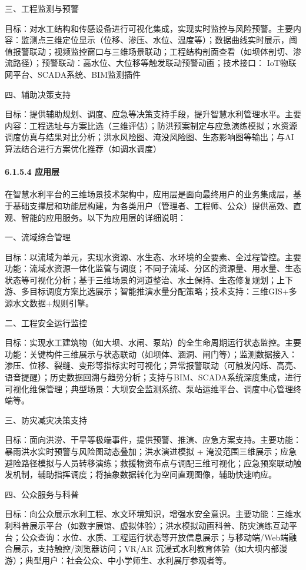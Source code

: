 三、工程监测与预警

目标：对水工结构和传感设备进行可视化集成，实现实时监控与风险预警。主要内容：监测点三维定位显示（位移、渗压、水位、温度等）；数据曲线实时展示，阈值报警联动；视频监控窗口与三维场景联动；工程结构剖面查看（如坝体剖切、渗流路径）；预警联动：高水位、大位移等触发联动预警动画；技术接口： IoT物联网平台、SCADA系统、BIM监测插件

四、辅助决策支持

目标：提供辅助规划、调度、应急等决策支持手段，提升智慧水利管理水平。主要内容：工程选址与方案比选（三维评估）；防洪预案制定与应急演练模拟；水资源调度仿真与结果对比分析；洪水风险图、淹没风险图、生态影响图等输出；与AI算法结合进行方案优化推荐（如调水调度）

\paragraph{6.1.5.4 应用层}\label{ux5e94ux7528ux5c42}

在智慧水利平台的三维场景技术架构中，应用层是面向最终用户的业务集成层，基于基础支撑层和功能层构建，为各类用户（管理者、工程师、公众）提供高效、直观、智能的应用服务。以下为应用层的详细说明：

一、流域综合管理

目标：以流域为单元，实现水资源、水生态、水环境的全要素、全过程管控。主要功能：流域水资源一体化监管与调度；不同子流域、分区的资源量、用水量、生态状态等可视化分析；基于三维场景的河道整治、水土保持、生态修复规划；上下游、多目标调度方案比选展示；智能推演水量分配策略；技术支持：三维GIS+多源水文数据+规则引擎。

二、工程安全运行监控

目标：实现水工建筑物（如大坝、水闸、泵站）的全生命周期运行状态监控。主要功能：关键构件三维展示与状态联动（如坝体、涵洞、闸门等）；监测数据接入：渗压、位移、裂缝、变形等指标实时可视化；异常报警联动（可触发闪烁、高亮、语音提醒）；历史数据回溯与趋势分析；支持与BIM、SCADA系统深度集成，进行可视化维保管理；典型场景：大坝安全监测系统、泵站运维平台、调度中心管理终端等。

三、防灾减灾决策支持

目标：面向洪涝、干旱等极端事件，提供预警、推演、应急方案支持。主要功能：暴雨洪水实时预警与风险图动态叠加；洪水演进模拟 + 淹没范围三维展示；应急避险路径模拟与人员转移演练；救援物资布点与调配三维可视化；应急预案联动触发机制，辅助指挥调度；将抽象数据转化为空间直观图像，辅助快速响应。

四、公众服务与科普

目标：向公众展示水利工程、水文环境知识，增强水安全意识。主要功能：三维水利科普展示平台（如数字展馆、虚拟体验）；洪水模拟动画科普、防灾演练互动平台；公众查询：水位、水质、工程运行状态等开放信息展示；与移动端/Web端融合展示，支持触控/浏览器访问；VR/AR 沉浸式水利教育体验（如大坝内部漫游）；典型用户：社会公众、中小学师生、水利展厅参观者等。

